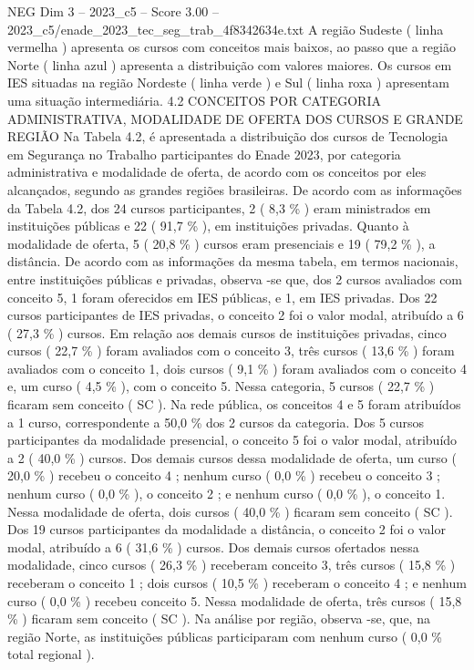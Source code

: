 \begin{textsample}{NEG Dim 3 – 2023\_c5 – Score 3.00 – 2023\_c5/enade\_2023\_tec\_seg\_trab\_4f8342634e.txt}
A região Sudeste ( linha vermelha ) apresenta os cursos com conceitos mais baixos, ao passo que a região Norte ( linha azul ) apresenta a distribuição com valores maiores.
Os cursos em IES situadas na região Nordeste ( linha verde ) e Sul ( linha roxa ) apresentam uma situação intermediária. 4.2 CONCEITOS POR CATEGORIA ADMINISTRATIVA, MODALIDADE DE OFERTA DOS CURSOS E GRANDE REGIÃO Na Tabela 4.2, é apresentada a distribuição dos cursos de Tecnologia em Segurança no Trabalho participantes do Enade 2023, por categoria administrativa e modalidade de oferta, de acordo com os conceitos por eles alcançados, segundo as grandes regiões brasileiras.
De acordo com as informações da Tabela 4.2, dos 24 cursos participantes, 2 ( 8,3 \% ) eram ministrados em instituições públicas e 22 ( 91,7 \% ), em instituições privadas.
Quanto à modalidade de oferta, 5 ( 20,8 \% ) cursos eram presenciais e 19 ( 79,2 \% ), a distância.
De acordo com as informações da mesma tabela, em termos nacionais, entre instituições públicas e privadas, observa -se que, dos 2 cursos avaliados com conceito 5, 1 foram oferecidos em IES públicas, e 1, em IES privadas.
Dos 22 cursos participantes de IES privadas, o conceito 2 foi o valor modal, atribuído a 6 ( 27,3 \% ) cursos.
Em relação aos demais cursos de instituições privadas, cinco cursos ( 22,7 \% ) foram avaliados com o conceito 3, três cursos ( 13,6 \% ) foram avaliados com o conceito 1, dois cursos ( 9,1 \% ) foram avaliados com o conceito 4 e, um curso ( 4,5 \% ), com o conceito 5.
Nessa categoria, 5 cursos ( 22,7 \% ) ficaram sem conceito ( SC ).
Na rede pública, os conceitos 4 e 5 foram atribuídos a 1 curso, correspondente a 50,0 \% dos 2 cursos da categoria.
Dos 5 cursos participantes da modalidade presencial, o conceito 5 foi o valor modal, atribuído a 2 ( 40,0 \% ) cursos.
Dos demais cursos dessa modalidade de oferta, um curso ( 20,0 \% ) recebeu o conceito 4 ; nenhum curso ( 0,0 \% ) recebeu o conceito 3 ; nenhum curso ( 0,0 \% ), o conceito 2 ; e nenhum curso ( 0,0 \% ), o conceito 1.
Nessa modalidade de oferta, dois cursos ( 40,0 \% ) ficaram sem conceito ( SC ).
Dos 19 cursos participantes da modalidade a distância, o conceito 2 foi o valor modal, atribuído a 6 ( 31,6 \% ) cursos.
Dos demais cursos ofertados nessa modalidade, cinco cursos ( 26,3 \% ) receberam conceito 3, três cursos ( 15,8 \% ) receberam o conceito 1 ; dois cursos ( 10,5 \% ) receberam o conceito 4 ; e nenhum curso ( 0,0 \% ) recebeu conceito 5.
Nessa modalidade de oferta, três cursos ( 15,8 \% ) ficaram sem conceito ( SC ).
Na análise por região, observa -se, que, na região Norte, as instituições públicas participaram com nenhum curso ( 0,0 \% total regional ).

\end{textsample}
